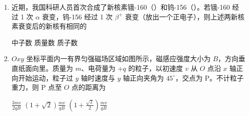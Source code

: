 \documentclass[\gkver]{gaokaozhenti}
\begin{document}
\begin{enumerate}
{$v_{1} = 10 \Ums$}
{$v_{2} = 15 \Ums$}
{$v_{2} = 30 \Ums$}


\item
近期，我国科研人员首次合成了新核素锇-160（）和钨-156（）。若锇-160 经过 1 次 $\alpha$ 衰变，钨-156 经过 1 次 $\beta^{+}$ 衰变（放出一个正电子），则上述两新核素衰变后的新核有相同的

{中子数}
{质量数}
{质子数}


\item
$Oxy$ 坐标平面内一有界匀强磁场区域如图所示，磁感应强度大小为 $B$，方向垂直纸面向里。质量为 $m$、电荷量为 $+q$ 的粒子，以初速度 $v$ 从 $O$ 点沿 $x$ 轴正向开始运动，粒子过 $y$ 轴时速度与 $y$ 轴正向夹角为 $45^{\circ}$，交点为 P。不计粒子重力，则 P 点至 $O$ 点的距离为


{$\frac{3mv}{2qB}$}
{$(1 + \sqrt{2})\frac{mv}{qB}$}
{$\left(1 + \frac{\sqrt{2}}{2}\right)\frac{mv}{qB}$}

\end{enumerate}
\end{document}
